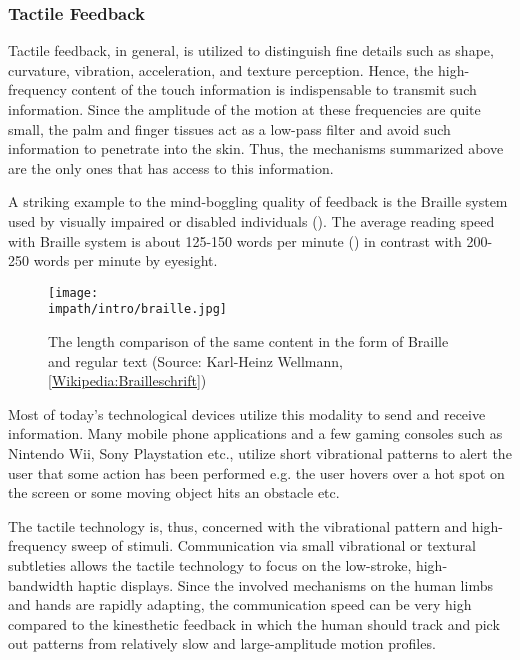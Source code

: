 \subsubsection{Tactile Feedback}

Tactile feedback, in general, is utilized to distinguish fine details such as shape, curvature, vibration, acceleration, and texture perception. Hence, the high-frequency content of the touch information is indispensable to transmit such information. Since the amplitude of the motion at these frequencies are quite small, the palm and finger tissues act as a low-pass filter and avoid such information to penetrate into the skin. Thus, the mechanisms summarized above are the only ones that has access to this information.

A striking example to the mind-boggling quality of feedback is the Braille system used by visually impaired or disabled individuals (). The average reading speed with Braille system is about 125-150 words per minute (\cite{americanblind}) in contrast with 200-250 words per minute by eyesight. 

\begin{figure}%
\centering
\texttt{[image: \\impath/intro/braille.jpg]}%
\caption[The length comparison of the same content in the form of Braille and 
regular text]{The length comparison of the same content in the form of Braille and 
regular text (Source: Karl-Heinz Wellmann, 
\href{http://de.wikipedia.org/wiki/Brailleschrift}{[Wikipedia:Brailleschrift]})}%
\label{fig:braille}%
\end{figure}

Most of today's technological devices utilize this modality to send and receive information. Many mobile phone applications and a few gaming consoles such as Nintendo Wii\raisebox{0.5ex}{\scriptsize\texttrademark}, Sony Playstation\raisebox{0.5ex}{\scriptsize\texttrademark} etc., utilize short vibrational patterns to alert the user that some action has been performed e.g. the user hovers over a hot spot on the screen or some moving object hits an obstacle etc. 

The tactile technology is, thus, concerned with the vibrational pattern and high-frequency sweep of stimuli. Communication via small vibrational or textural subtleties allows the tactile technology to focus on the low-stroke, high-bandwidth haptic displays. Since the involved mechanisms on the human limbs and hands are rapidly adapting, the communication speed can be very high compared to the kinesthetic feedback in which the human should track and pick out patterns from relatively slow and large-amplitude motion profiles. 


